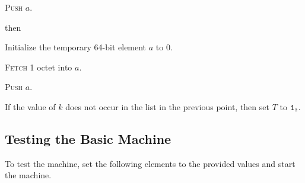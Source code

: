\documentclass[a4paper,12pt]{article}
\newcommand{\num}[1]{\texttt{#1}}
\newcommand{\hex}[1]{\num{#1}_{\textup{\tiny 16}}}
\newcommand{\bin}[1]{\num{#1}_{\textup{\tiny 2}}}
\newcommand{\TERM}{T}
\newcommand{\T}{\bin{1}}
\newcommand{\proc}[1]{\textsc{#1}}
\newcommand{\op}[1]{$#1$}
\newcommand{\PUSHB}     [1]{\op{\hex{08}}}
\begin{document}
\begin{stepnumbers}
\begin{description}
\begin{stepnumbers}
    \item \proc{Push} $a$.
    \end{stepnumbers}
  \item[\PUSHB{}] then
    \begin{stepnumbers}
    \item Initialize the temporary 64-bit element $a$ to 0.
    \item \proc{Fetch} 1 octet into $a$.
    \item \proc{Push} $a$.
    \end{stepnumbers}
  \end{description}
\item If the value of $k$ does not occur in the list in the previous point, then set $\TERM$ to $\T$.
\end{stepnumbers}

\subsection{Testing the Basic Machine}

To test the machine, set the following elements to the provided values and start the machine.
\end{document}
